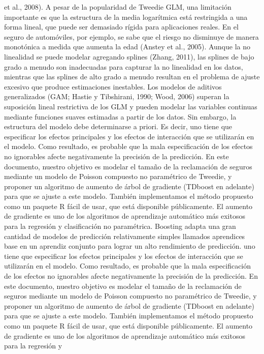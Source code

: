 \documentclass[]{article}
\begin{document}
et al., 2008). A pesar de la popularidad de Tweedie GLM, una limitación
importante es que la estructura de la media logarítmica está restringida
a una forma lineal, que puede ser demasiado rígida para aplicaciones
reales. En el seguro de automóviles, por ejemplo, se sabe que el riesgo
no disminuye de manera monotónica a medida que aumenta la edad (Anstey
et al., 2005). Aunque la no linealidad se puede modelar agregando
splines (Zhang, 2011), las splines de bajo grado a menudo son
inadecuadas para capturar la no linealidad en los datos, mientras que
las splines de alto grado a menudo resultan en el problema de ajuste
excesivo que produce estimaciones inestables. Los modelos de aditivos
generalizados (GAM; Hastie y Tibshirani, 1990; Wood, 2006) superan la
suposición lineal restrictiva de los GLM y pueden modelar las variables
continuas mediante funciones suaves estimadas a partir de los datos. Sin
embargo, la estructura del modelo debe determinarse a priori. Es decir,
uno tiene que especificar los efectos principales y los efectos de
interacción que se utilizarán en el modelo. Como resultado, es probable
que la mala especificación de los efectos no ignorables afecte
negativamente la precisión de la predicción. En este documento, nuestro
objetivo es modelar el tamaño de la reclamación de seguros mediante un
modelo de Poisson compuesto no paramétrico de Tweedie, y proponer un
algoritmo de aumento de árbol de gradiente (TDboost en adelante) para
que se ajuste a este modelo. También implementamos el método propuesto
como un paquete R fácil de usar, que está disponible públicamente. El
aumento de gradiente es uno de los algoritmos de aprendizaje automático
más exitosos para la regresión y clasificación no paramétrica. Boosting
adapta una gran cantidad de modelos de predicción relativamente simples
llamados aprendices base en un aprendiz conjunto para lograr un alto
rendimiento de predicción. uno tiene que especificar los efectos
principales y los efectos de interacción que se utilizarán en el modelo.
Como resultado, es probable que la mala especificación de los efectos no
ignorables afecte negativamente la precisión de la predicción. En este
documento, nuestro objetivo es modelar el tamaño de la reclamación de
seguros mediante un modelo de Poisson compuesto no paramétrico de
Tweedie, y proponer un algoritmo de aumento de árbol de gradiente
(TDboost en adelante) para que se ajuste a este modelo. También
implementamos el método propuesto como un paquete R fácil de usar, que
está disponible públicamente. El aumento de gradiente es uno de los
algoritmos de aprendizaje automático más exitosos para la regresión y
\end{document}
